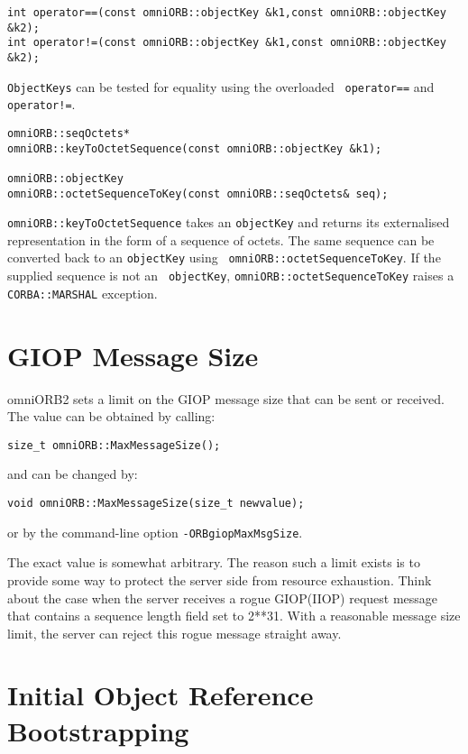\documentclass[11pt,twoside,onecolumn]{book}
\begin{document}
{\small
\begin{verbatim}
int operator==(const omniORB::objectKey &k1,const omniORB::objectKey &k2);
int operator!=(const omniORB::objectKey &k1,const omniORB::objectKey &k2);
\end{verbatim}
}

{\tt ObjectKeys} can be tested for equality using the overloaded {\tt
operator==} and {\tt operator!=}.

{\small
\begin{verbatim}
omniORB::seqOctets*
omniORB::keyToOctetSequence(const omniORB::objectKey &k1);

omniORB::objectKey
omniORB::octetSequenceToKey(const omniORB::seqOctets& seq);
\end{verbatim}
}

{\tt omniORB::keyToOctetSequence} takes an {\tt objectKey} and returns its
externalised representation in the form of a sequence of octets. The same
sequence can be converted back to an {\tt objectKey} using {\tt
omniORB::octetSequenceToKey}. If the supplied sequence is not an {\tt
objectKey}, {\tt omniORB::octetSequenceToKey} raises a {\tt CORBA::MARSHAL}
exception.


\section{GIOP Message Size}
\label{giopmsg}

omniORB2 sets a limit on the GIOP message size that can be sent or
received. The value can be obtained by calling:
{\small
\begin{verbatim}
size_t omniORB::MaxMessageSize();
\end{verbatim}
}
\noindent and can be changed by:

{\small
\begin{verbatim}
void omniORB::MaxMessageSize(size_t newvalue);
\end{verbatim}
}

\noindent or by the command-line option {\tt -ORBgiopMaxMsgSize}.

The exact value is somewhat arbitrary. The reason such a limit exists is to
provide some way to protect the server side from resource exhaustion. Think
about the case when the server receives a rogue GIOP(IIOP) request message
that contains a sequence length field set to 2**31. With a reasonable
message size limit, the server can reject this rogue message straight away.

\section{Initial Object Reference Bootstrapping}
\label{bootstrap}
\end{document}

